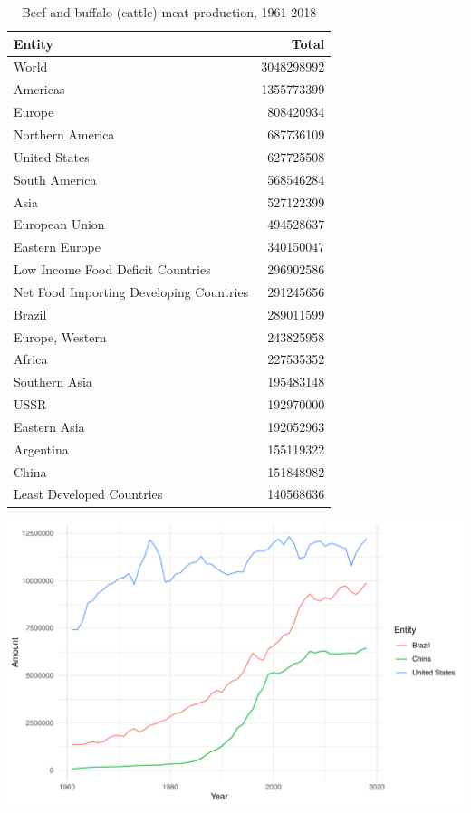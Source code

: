 \documentclass[11pt,a4paper,]{article}
\begin{document}
\begin{table}

\caption{\label{tab:cattle}Beef and buffalo (cattle) meat production, 1961-2018}
\centering
\begin{tabular}[t]{lr}
\toprule
Entity & Total\\
\midrule
World & 3048298992\\
Americas & 1355773399\\
Europe & 808420934\\
Northern America & 687736109\\
United States & 627725508\\
\addlinespace
South America & 568546284\\
Asia & 527122399\\
European Union & 494528637\\
Eastern Europe & 340150047\\
Low Income Food Deficit Countries & 296902586\\
\addlinespace
Net Food Importing Developing Countries & 291245656\\
Brazil & 289011599\\
Europe, Western & 243825958\\
Africa & 227535352\\
Southern Asia & 195483148\\
\addlinespace
USSR & 192970000\\
Eastern Asia & 192052963\\
Argentina & 155119322\\
China & 151848982\\
Least Developed Countries & 140568636\\
\bottomrule
\end{tabular}
\end{table}

\includegraphics{report_files/figure-latex/cattle-1.pdf}
\end{document}
